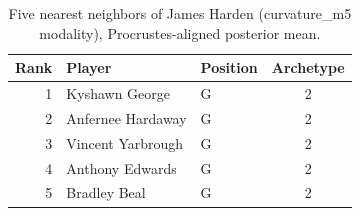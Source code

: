 \begin{table}[htbp]
  \centering\small
  \begin{tabular}{rllc}
    \toprule
    Rank & Player & Position & Archetype \\
    \midrule
    1 & Kyshawn George & G & 2 \\
    2 & Anfernee Hardaway & G & 2 \\
    3 & Vincent Yarbrough & G & 2 \\
    4 & Anthony Edwards & G & 2 \\
    5 & Bradley Beal & G & 2 \\
    \bottomrule
  \end{tabular}
  \caption{Five nearest neighbors of James Harden (curvature_m5 modality), Procrustes-aligned posterior mean.}
  \label{tab:James_Harden_neighbors_curvature_m5}
\end{table}

